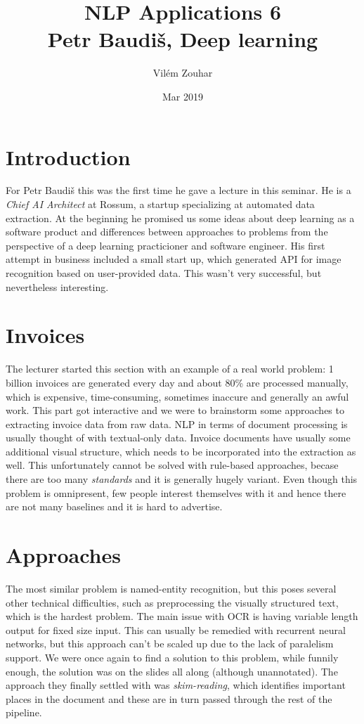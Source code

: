 \documentclass[a4paper]{article}
\begin{document}
\title{NLP Applications 6\\Petr Baudiš, Deep learning}
\author{Vilém Zouhar}
\date{Mar 2019}
\maketitle 

\section*{Introduction}

For Petr Baudiš this was the first time he gave a lecture in this seminar. He is a \textit{Chief AI Architect} at Rossum, a startup specializing at automated data extraction. At the beginning he promised us some ideas about deep learning as a software product and differences between approaches to problems from the perspective of a deep learning practicioner and software engineer. His first attempt in business included a small start up, which generated API for image recognition based on user-provided data. This wasn't very successful, but nevertheless interesting.

\section*{Invoices}

The lecturer started this section with an example of a real world problem: 1 billion invoices are generated every day and about 80\% are processed manually, which is expensive, time-consuming, sometimes inaccure and generally an awful work. This part got interactive and we were to brainstorm some approaches to extracting invoice data from raw data. NLP in terms of document processing is usually thought of with textual-only data. Invoice documents have usually some additional visual structure, which needs to be incorporated into the extraction as well. This unfortunately cannot be solved with rule-based approaches, becase there are too many \textit{standards} and it is generally hugely variant. Even though this problem is omnipresent, few people interest themselves with it and hence there are not many baselines and it is hard to advertise.

\section*{Approaches}

The most similar problem is named-entity recognition, but this poses several other technical difficulties, such as preprocessing the visually structured text, which is the hardest problem. The main issue with OCR is having variable length output for fixed size input. This can usually be remedied with recurrent neural networks, but this approach can't be scaled up due to the lack of paralelism support. We were once again to find a solution to this problem, while funnily enough, the solution was on the slides all along (although unannotated). The approach they finally settled with was \textit{skim-reading}, which identifies important places in the document and these are in turn passed through the rest of the pipeline.
\end{document}
